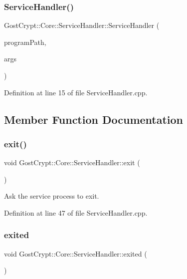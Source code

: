 \subsubsection{\texorpdfstring{Service\+Handler()}{ServiceHandler()}}
{\footnotesize\ttfamily Gost\+Crypt\+::\+Core\+::\+Service\+Handler\+::\+Service\+Handler (\begin{DoxyParamCaption}\item[{Q\+String}]{program\+Path,  }\item[{Q\+String\+List}]{args }\end{DoxyParamCaption})}



Definition at line 15 of file Service\+Handler.\+cpp.



\subsection{Member Function Documentation}
\mbox{\label{class_gost_crypt_1_1_core_1_1_service_handler_ac9113ccad5366959c2ea5cce7762c7cb}} 
\subsubsection{\texorpdfstring{exit()}{exit()}}
{\footnotesize\ttfamily void Gost\+Crypt\+::\+Core\+::\+Service\+Handler\+::exit (\begin{DoxyParamCaption}{ }\end{DoxyParamCaption})}



Ask the service process to exit. 



Definition at line 47 of file Service\+Handler.\+cpp.

\mbox{\label{class_gost_crypt_1_1_core_1_1_service_handler_ac7cbfba2730adcce6f6ba3129b265e73}} 
\subsubsection{\texorpdfstring{exited}{exited}}
{\footnotesize\ttfamily void Gost\+Crypt\+::\+Core\+::\+Service\+Handler\+::exited (\begin{DoxyParamCaption}{ }\end{DoxyParamCaption})\hspace{0.3cm}{\ttfamily [signal]}}



